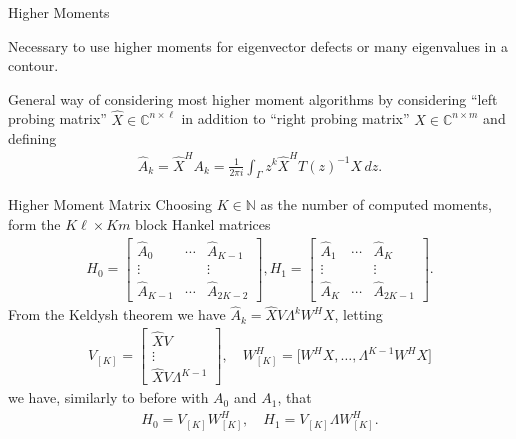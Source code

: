 \documentclass[mathserif]{beamer}
\begin{document}
\begin{frame}{Higher Moments}
	
	Necessary to use higher moments for eigenvector defects or many eigenvalues in a contour.
	\vspace{1em}

	General way of considering most higher moment algorithms by considering ``left probing matrix'' \( \widehat{X} \in \mathbb{C}^{n\times \ell} \) in addition to ``right probing matrix'' \( X \in \mathbb{C}^{n\times m} \) and defining
	\begin{align}
		\widehat{A}_k = \widehat{X}^H A_k
		= \frac{1}{2 \pi i} \int_{\Gamma} z^k \widehat{X}^H {T(z)}^{-1} X \, dz.
	\end{align}


\end{frame}

\begin{frame}{Higher Moment Matrix}
	Choosing \( K \in \mathbb{N} \) as the number of computed moments, form the \( K \ell \times K m \) block Hankel matrices
	\begin{align}
		H_0 = 
		\begin{bmatrix}
			\widehat{A}_0      & \cdots & \widehat{A}_{K-1}  \\
			\vdots             &        & \vdots \\
			\widehat{A}_{K-1}  & \cdots & \widehat{A}_{2K-2} 
		\end{bmatrix},
		H_1 = 
		\begin{bmatrix}
			\widehat{A}_1      & \cdots & \widehat{A}_{K}  \\
			\vdots             &        & \vdots \\
			\widehat{A}_{K}    & \cdots & \widehat{A}_{2K-1} 
		\end{bmatrix}.
	\end{align}
	From the Keldysh theorem we have \( \widehat{A}_k = \widehat{X}V\Lambda^k W^H X \), letting
	\begin{align}
		V_{[K]} = 
		\begin{bmatrix}
			\widehat{X}V \\
			\vdots \\
			\widehat{X} V \Lambda^{K-1}
		\end{bmatrix},
		\quad
		W^H_{[K]} = \big[W^HX, \ldots, \Lambda^{K-1} W^H X \big]
	\end{align}
	we have, similarly to before with \( A_0\) and \(A_1 \), that 
	\begin{align}
		H_0 = V_{[K]}W^H_{[K]}, \quad
		H_1 = V_{[K]} \Lambda W^H_{[K]}.
	\end{align}
\end{frame}
\end{document}
